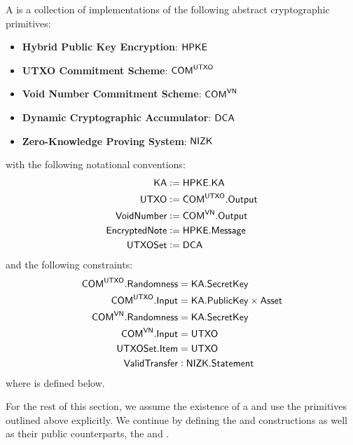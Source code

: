 \begin{definition}
    A \TransferConfiguration{} is a collection of implementations of the following abstract cryptographic primitives:
    \begin{itemize}
        \item \textbf{Hybrid Public Key Encryption}: ${\textsf{HPKE}}$
        \item \textbf{UTXO Commitment Scheme}: ${\textsf{COM}}^{{\textsf{UTXO}}}$
        \item \textbf{Void Number Commitment Scheme}: ${\textsf{COM}}^{{\textsf{VN}}}$
        \item \textbf{Dynamic Cryptographic Accumulator}: ${\textsf{DCA}}$
        \item \textbf{Zero-Knowledge Proving System}: ${\textsf{NIZK}}$
    \end{itemize}
    with the following notational conventions:
    \begin{align*}
        {\textsf{KA}}            &:= {\textsf{HPKE}}.{\textsf{KA}} \\
        {\textsf{UTXO}}          &:= {\textsf{COM}}^{{\textsf{UTXO}}}.{\textsf{Output}} \\
        {\textsf{VoidNumber}}    &:= {\textsf{COM}}^{{\textsf{VN}}}.{\textsf{Output}} \\
        {\textsf{EncryptedNote}} &:= {\textsf{HPKE}}.{\textsf{Message}} \\
        {\textsf{UTXOSet}}       &:= {\textsf{DCA}}
    \end{align*}
    and the following constraints:
    \begin{align*}
        {\textsf{COM}}^{{\textsf{UTXO}}}.{\textsf{Randomness}} &= {\textsf{KA}}.{\textsf{SecretKey}} \\
        {\textsf{COM}}^{{\textsf{UTXO}}}.{\textsf{Input}}      &= {\textsf{KA}}.{\textsf{PublicKey}} \times {\textsf{Asset}} \\
        {\textsf{COM}}^{{\textsf{VN}}}.{\textsf{Randomness}}   &= {\textsf{KA}}.{\textsf{SecretKey}} \\
        {\textsf{COM}}^{{\textsf{VN}}}.{\textsf{Input}}        &= {\textsf{UTXO}} \\
        {\textsf{UTXOSet}}.{\textsf{Item}}           &= {\textsf{UTXO}} \\
        {\textsf{ValidTransfer}}           &: {\textsf{NIZK}}.{\textsf{Statement}}
    \end{align*}
    where \ValidTransfer{} is defined below.
\end{definition}

For the rest of this section, we assume the existence of a \TransferConfiguration{} and use the primitives outlined above explicitly. We continue by defining the \Sender{} and \Receiver{} constructions as well as their public counterparts, the \SenderPost{} and \ReceiverPost{}.

